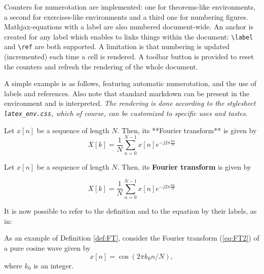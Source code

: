     Counters for numerotation are implemented: one for theorems-like
environments, a second for exercises-like environments and a third one
for numbering figures.\\
Mathjax-equations with a label are also numbered document-wide. An
anchor is created for any label which enables to links things within the
document: \texttt{\textbackslash{}label} and
\texttt{\textbackslash{}ref} are both supported. A limitation is that
numbering is updated (incremented) each time a cell is rendered. A
toolbar button is provided to reset the counters and refresh the
rendering of the whole document.

    \label{example:mixing} A simple example is as follows, featuring
automatic numerotation, and the use of labels and references. Also note
that standard markdown can be present in the environment and is
interpreted. \emph{The rendering is done according to the stylesheet
\texttt{latex\_env.css}, which of course, can be customized to specific
uses and tastes}.

\begin{listing}
\begin{definition} \label{def:FT}
Let $x[n]$ be a sequence of length $N$. Then, its **Fourier transform** is given by
\begin{equation}
\label{eq:FT}
X[k]= \frac{1}{N} \sum_{n=0}^{N-1} x[n] e^{-j2\pi \frac{kn}{N}}
\end{equation}
\end{definition}
\end{listing}

    \begin{definition} \label{def:FT} Let \(x[n]\) be a sequence of
length \(N\). Then, its \textbf{Fourier transform} is given by

\begin{equation}
\label{eq:FT2}
X[k]= \frac{1}{N} \sum_{n=0}^{N-1} x[n] e^{-j2\pi \frac{kn}{N}}
\end{equation}

\end{definition}

    It is now possible to refer to the definition and to the equation by
their labels, as in:

\begin{listing}
As an example of Definition \ref{def:FT}, consider the Fourier transform (\ref{eq:FT2}) of a pure cosine wave given by
$$
x[n]= \cos(2\pi k_0 n/N),
$$
where $k_0$ is an integer. 
\end{listing}

